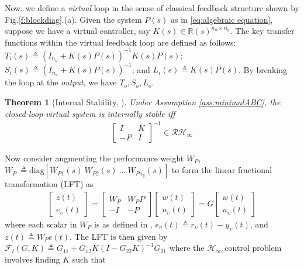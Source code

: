 \documentclass[journal]{IEEEtran}
\newtheorem{theorem}{Theorem}
\theoremstyle{remark}
\begin{document}
Now, we define a \textit{virtual} loop in the sense of classical feedback structure shown by Fig.\ref{f:blockdiag}.(a). Given the system $P(s)$ as in \eqref{eq:algebraic equation}, suppose we have a virtual controller, say $K(s) \in \mathbb{R}(s)^{n_u \times n_y}$. The key transfer functions within the virtual feedback loop are defined as follows: \( T_i(s) \triangleq (I_{n_u} + K(s)P(s))^{-1}K(s)P(s) \); \( S_i(s) \triangleq (I_{n_u} + K(s)P(s))^{-1} \); and \( L_i(s) \triangleq K(s)P(s) \). By breaking the loop at the \textit{output}, we have $T_o,S_o,L_o$.
\begin{theorem}[Internal Stability, \cite{zhou1998essentials}] \label{th:internal_stab}
Under Assumption \ref{ass:minimalABC}, the closed-loop virtual system is internally stable iff
\begin{align}\label{eq:internal_stab_matrix}
    \begin{bmatrix}
        I & K\\
        -P & I
    \end{bmatrix}^{-1} \in \mathcal{R}\mathcal{H}_\infty
\end{align}
\end{theorem}
Now consider augmenting the performance weight ${W}_{P}$, ${W}_{P}~\triangleq \text{diag} [ {W_{P1}}(s) \ {W_{P2}}(s) \ \dots \ {W_{Pn_y}}(s)]$ to form the linear fractional transformation (LFT) as
\begin{align} \label{eq:augmentedG}
\begin{bmatrix}
        z(t)\\
    e_\upsilon(t)
\end{bmatrix}
={\begin{bmatrix}
    W_P & W_PP\\
    -I & -P
\end{bmatrix}}\begin{bmatrix}
    w(t)\\
  u_\upsilon(t)
\end{bmatrix}=G\begin{bmatrix}
    w(t)\\
  u_\upsilon(t)
\end{bmatrix}
\end{align}
where each scalar in $W_P$ is as defined in \cite[Equation 22]{kurkccu2018robust}, $e_\upsilon(t) \triangleq r_\upsilon(t)-y_\upsilon(t)$, and $z(t)\triangleq W_Pe(t)$. The LFT is then given by $\mathcal{F}_l(G,K)\triangleq {G}_{11}+{G}_{12}{K}({I}-{G}_{22}{K})^{-1}{G}_{21}$ where the $\mathcal{H}_\infty$ control problem involves finding $K$ such that
\end{document}
